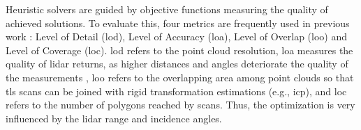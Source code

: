 Heuristic solvers are guided by objective functions measuring the quality of achieved solutions. To evaluate this, four metrics are frequently used in previous work \cite{li_3d_2022, aryan_planning_2021}: Level of Detail (\acrshort{lod}), Level of Accuracy (\acrshort{loa}), Level of Overlap (\acrshort{loo}) and Level of Coverage (\acrshort{loc}). \acrshort{lod} refers to the point cloud resolution, \acrshort{loa} measures the quality of \acrshort{lidar} returns, as higher distances and angles deteriorate the quality of the measurements \cite{ aryan_planning_2021}, \acrshort{loo} refers to the overlapping area among point clouds so that \acrshort{tls} scans can be joined with rigid transformation estimations (e.g., \acrshort{icp}), and \acrshort{loc} refers to the number of polygons reached by scans. Thus, the optimization is very influenced by the \acrshort{lidar} range and incidence angles. 

